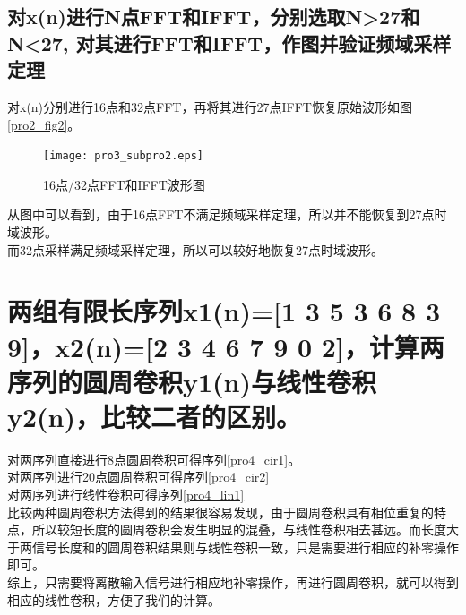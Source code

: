 \documentclass[UTF8]{article}
\begin{document}
\begin{CJK}{UTF8}{gkai}
\subsection{对x(n)进行N点FFT和IFFT，分别选取N>27和N<27, 对其进行FFT和IFFT，作图并验证频域采样定理}
对x(n)分别进行16点和32点FFT，再将其进行27点IFFT恢复原始波形如图\ref{pro2_fig2}。
\begin{figure}
  \texttt{[image: pro3\_subpro2.eps]}
  \caption{16点/32点FFT和IFFT波形图}
  \label{pro3_fig2}
\end{figure}

从图中可以看到，由于16点FFT不满足频域采样定理，所以并不能恢复到27点时域波形。\\
而32点采样满足频域采样定理，所以可以较好地恢复27点时域波形。
\section{两组有限长序列x1(n)=[1 3 5 3 6 8 3 9]，x2(n)=[2 3 4 6 7 9 0 2]，计算两序列的圆周卷积y1(n)与线性卷积y2(n)，比较二者的区别。}
对两序列直接进行8点圆周卷积可得序列\ref{pro4_cir1}。
\begin{equation}
  \label{pro4_cir1}
\end{equation}
对两序列进行20点圆周卷积可得序列\ref{pro4_cir2}
\begin{equation}
  \label{pro4_cir2}
\end{equation}
对两序列进行线性卷积可得序列\ref{pro4_lin1}
\begin{equation}
  \label{pro4_lin1}
\end{equation}
比较两种圆周卷积方法得到的结果很容易发现，由于圆周卷积具有相位重复的特点，所以较短长度的圆周卷积会发生明显的混叠，与线性卷积相去甚远。而长度大于两信号长度和的圆周卷积结果则与线性卷积一致，只是需要进行相应的补零操作即可。\\
综上，只需要将离散输入信号进行相应地补零操作，再进行圆周卷积，就可以得到相应的线性卷积，方便了我们的计算。

\end{CJK}
\end{document}
